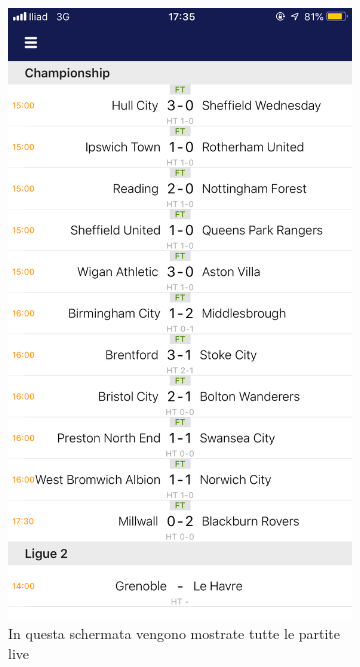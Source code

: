 \documentclass[numbers=noenddot, 12pt, a4paper, oneside]{scrbook}
\begin{document}
\begin{figure}[H]
	\begin{subfigure}{.5\textwidth}
		\centering
		\includegraphics[width=.8\linewidth]{images/Screen/Live}
		\caption{In questa schermata vengono mostrate tutte le partite live}
	\end{subfigure}
	\begin{subfigure}{.5\textwidth}
		\centering

\end{subfigure}
\end{figure}
\end{document}
